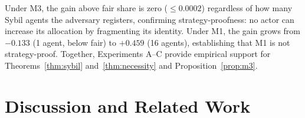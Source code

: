 \documentclass[11pt]{article}
\theoremstyle{plain}
\theoremstyle{definition}
\theoremstyle{remark}
\begin{document}
\noindent
Under M3, the gain above fair share is zero ($\le 0.0002$) regardless of
how many Sybil agents the adversary registers, confirming
strategy-proofness: no actor can increase its allocation by fragmenting
its identity.  Under M1, the gain grows from $-0.133$ (1 agent, below
fair) to $+0.459$ (16 agents), establishing that M1 is not
strategy-proof.  Together, Experiments A--C provide empirical support for
Theorems~\ref{thm:sybil} and~\ref{thm:necessity} and
Proposition~\ref{prop:m3}.

\section{Discussion and Related Work}
\label{sec:discussion}

%
%
%
%
%
%
\end{document}
